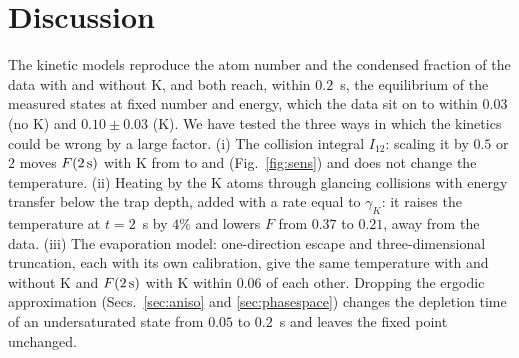 \section{Discussion}
\label{sec:disc}
The kinetic models reproduce the atom number and the condensed fraction of
the data with and without K, and both reach, within $0.2$~s, the equilibrium
of the measured states at fixed number and energy, which the data sit on to
within $0.03$ (no K) and $0.10\pm0.03$ (K). We have tested the three ways in
which the kinetics could be wrong by a large factor. (i) The collision
integral $I_{12}$: scaling it by $0.5$ or $2$ moves $F(2\,{\rm s})$ with K
from \sensreference{} to \sensCxiiHalf{} and \sensCxiiTwo{}
(Fig.~\ref{fig:sens}) and does not change the temperature. (ii) Heating by
the K atoms through glancing collisions with energy transfer below the trap
depth, added with a rate equal to $\gamma_K$: it raises the temperature at
$t=2$~s by $4\%$ and lowers $F$ from $0.37$ to $0.21$, away from the data.
(iii) The evaporation model: one-direction escape and three-dimensional
truncation, each with its own calibration, give the same temperature with
and without K and $F(2\,{\rm s})$ with K within $0.06$ of each other.
Dropping the ergodic approximation (Secs.~\ref{sec:aniso} and
\ref{sec:phasespace}) changes the depletion time of an undersaturated state
from $0.05$ to $0.2$~s and leaves the fixed point unchanged.

